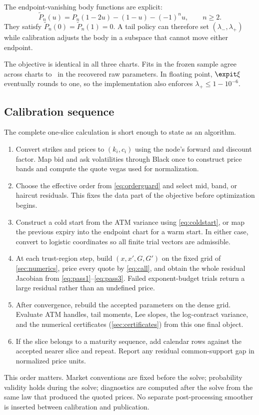 The endpoint-vanishing body functions are explicit:
\begin{equation}
\widetilde P_n(u)=P_n(1-2u)-(1-u)-(-1)^nu,\qquad n\ge2.
\label{eq:endpointbasis}
\end{equation}
They satisfy $\widetilde P_n(0)=\widetilde P_n(1)=0$.  A tail policy can
therefore set $(\lambda_-,\lambda_+)$ while calibration adjusts the body in a
subspace that cannot move either endpoint.

The objective is identical in all three charts.  Fits in the frozen sample
agree across charts to \MacChartEquivParamAgree\ in the recovered raw
parameters.  In floating point, $\expit\xi$ eventually rounds to one, so the
implementation also enforces $\lambda_+\le1-10^{-6}$.

\subsection{Calibration sequence}

The complete one-slice calculation is short enough to state as an algorithm.

\begin{enumerate}
\item Convert strikes and prices to $(k_i,c_i)$ using the node's forward and
discount factor.  Map bid and ask volatilities through Black once to construct
price bands and compute the quote vegas used for normalization.
\item Choose the effective order from \eqref{eq:orderguard} and select mid,
band, or haircut residuals.  This fixes the data part of the objective before
optimization begins.
\item Construct a cold start from the ATM variance using
\eqref{eq:coldstart}, or map the previous expiry into the endpoint chart for a
warm start.  In either case, convert to logistic coordinates so all finite
trial vectors are admissible.
\item At each trust-region step, build $(x,x',G,G')$ on the fixed grid of
\cref{sec:numerics}, price every quote by \eqref{eq:call}, and obtain the
whole residual Jacobian from \eqref{eq:pass1}--\eqref{eq:pass3}.  Failed
exponent-budget trials return a large residual rather than an undefined
price.
\item After convergence, rebuild the accepted parameters on the dense grid.
Evaluate ATM handles, tail moments, Lee slopes, the log-contract variance, and
the numerical certificates (\cref{sec:certificates}) from this one final
object.
\item If the slice belongs to a maturity sequence, add calendar rows against
the accepted nearer slice and repeat.  Report any residual common-support
gap in normalized price units.
\end{enumerate}

This order matters.  Market conventions are fixed before the solve;
probability validity holds during the solve; diagnostics are computed after
the solve from the same law that produced the quoted prices.  No separate
post-processing smoother is inserted between calibration and publication.
